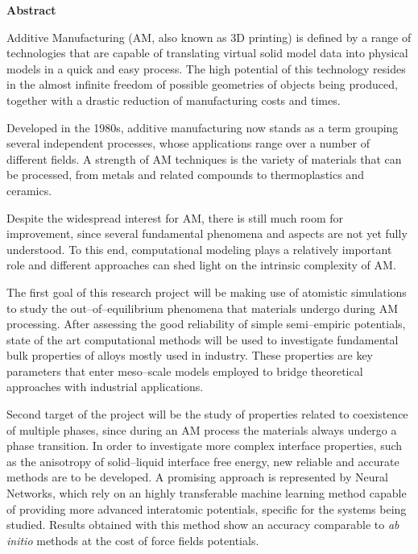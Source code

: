 \thispagestyle{empty}
\begin{center}
	{\Large\bfseries Abstract}
\end{center}

Additive Manufacturing (AM, also known as 3D printing) is defined by a range of technologies that are capable of translating virtual solid model data into physical models in a quick and easy process.
The high potential of this technology resides in the almost infinite freedom of possible geometries of objects being produced, together with a drastic reduction of manufacturing costs and times.

Developed in the 1980s, additive manufacturing now stands as a term grouping several independent processes, whose applications range over a number of different fields.  
A strength of AM techniques is the variety of materials that can be processed, from metals and related compounds to thermoplastics and ceramics.

Despite the widespread interest for AM, there is still much room for improvement, since several fundamental phenomena and aspects are not yet fully understood.
To this end, computational modeling plays a relatively important role and different approaches can shed light on the intrinsic complexity of AM.

The first goal of this research project will be making use of atomistic simulations to study the out--of--equilibrium phenomena that materials undergo during AM processing. After assessing the good reliability of simple semi--empiric potentials, state of the art computational methods will be used to investigate fundamental bulk properties of alloys mostly used in industry. These properties are key parameters that enter meso--scale models employed to bridge theoretical approaches with industrial applications.


Second target of the project will be the study of properties related to coexistence of multiple phases, since during an AM process the materials always undergo a phase transition. In order to investigate more complex interface properties, such as the anisotropy of solid--liquid interface free energy, new reliable and accurate methods are to be developed.
A promising approach is represented by Neural Networks, which rely on an highly transferable machine learning method capable of providing more advanced interatomic potentials, specific for the systems being studied. Results obtained with this method show an accuracy comparable to \textit{ab initio} methods at the cost of force fields potentials. 




